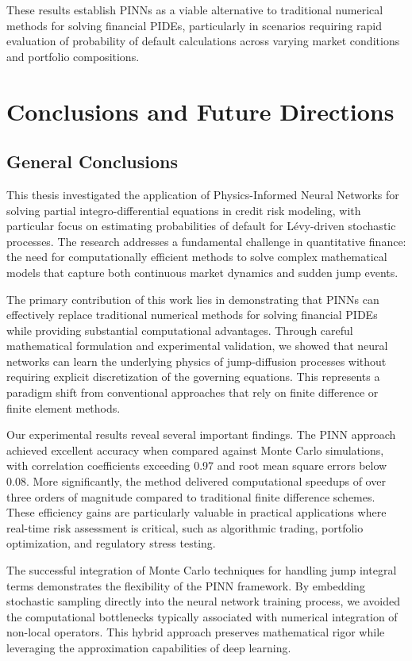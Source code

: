 \documentclass[11pt,twoside,openright]{report}
\begin{document}
These results establish PINNs as a viable alternative to traditional numerical methods for solving financial PIDEs, particularly in scenarios requiring rapid evaluation of probability of default calculations across varying market conditions and portfolio compositions.

\chapter{Conclusions and Future Directions}
\label{ch:conclusions}

\section{General Conclusions}

This thesis investigated the application of Physics-Informed Neural Networks for solving partial integro-differential equations in credit risk modeling, with particular focus on estimating probabilities of default for Lévy-driven stochastic processes. The research addresses a fundamental challenge in quantitative finance: the need for computationally efficient methods to solve complex mathematical models that capture both continuous market dynamics and sudden jump events.

The primary contribution of this work lies in demonstrating that PINNs can effectively replace traditional numerical methods for solving financial PIDEs while providing substantial computational advantages. Through careful mathematical formulation and experimental validation, we showed that neural networks can learn the underlying physics of jump-diffusion processes without requiring explicit discretization of the governing equations. This represents a paradigm shift from conventional approaches that rely on finite difference or finite element methods.

Our experimental results reveal several important findings. The PINN approach achieved excellent accuracy when compared against Monte Carlo simulations, with correlation coefficients exceeding 0.97 and root mean square errors below 0.08. More significantly, the method delivered computational speedups of over three orders of magnitude compared to traditional finite difference schemes. These efficiency gains are particularly valuable in practical applications where real-time risk assessment is critical, such as algorithmic trading, portfolio optimization, and regulatory stress testing.

The successful integration of Monte Carlo techniques for handling jump integral terms demonstrates the flexibility of the PINN framework. By embedding stochastic sampling directly into the neural network training process, we avoided the computational bottlenecks typically associated with numerical integration of non-local operators. This hybrid approach preserves mathematical rigor while leveraging the approximation capabilities of deep learning.
\end{document}
